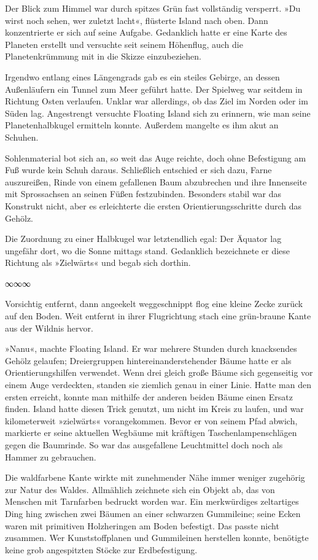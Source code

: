 Der Blick zum Himmel war durch spitzes Grün fast vollständig versperrt. »Du wirst noch sehen, wer zuletzt lacht«, flüsterte Island nach oben. Dann konzentrierte er sich auf seine Aufgabe. Gedanklich hatte er eine Karte des Planeten erstellt und versuchte seit seinem Höhenflug, auch die Planetenkrümmung mit in die Skizze einzubeziehen.

Irgendwo entlang eines Längengrads gab es ein steiles Gebirge, an dessen Außenläufern ein Tunnel zum Meer geführt hatte. Der Spielweg war seitdem in Richtung Osten verlaufen. Unklar war allerdings, ob das Ziel im Norden oder im Süden lag. Angestrengt versuchte Floating Island sich zu erinnern, wie man seine Planetenhalbkugel ermitteln konnte. Außerdem mangelte es ihm akut an Schuhen.

Sohlenmaterial bot sich an, so weit das Auge reichte, doch ohne Befestigung am Fuß wurde kein Schuh daraus. Schließlich entschied er sich dazu, Farne auszureißen, Rinde von einem gefallenen Baum abzubrechen und ihre Innenseite mit Sprossachsen an seinen Füßen festzubinden. Besonders stabil war das Konstrukt nicht, aber es erleichterte die ersten Orientierungsschritte durch das Gehölz.

Die Zuordnung zu einer Halbkugel war letztendlich egal: Der Äquator lag ungefähr dort, wo die Sonne mittags stand. Gedanklich bezeichnete er diese Richtung als »Zielwärts« und begab sich dorthin.

\begin{center}
	∞∞∞
\end{center}

Vorsichtig entfernt, dann angeekelt weggeschnippt flog eine kleine Zecke zurück auf den Boden. Weit entfernt in ihrer Flugrichtung stach eine grün-braune Kante aus der Wildnis hervor.

»Nanu«, machte Floating Island. Er war mehrere Stunden durch knacksendes Gehölz gelaufen; Dreiergruppen hintereinanderstehender Bäume hatte er als Orientierungshilfen verwendet. Wenn drei gleich große Bäume sich gegenseitig vor einem Auge verdeckten, standen sie ziemlich genau in einer Linie. Hatte man den ersten erreicht, konnte man mithilfe der anderen beiden Bäume einen Ersatz finden. Island hatte diesen Trick genutzt, um nicht im Kreis zu laufen, und war kilometerweit »zielwärts« vorangekommen. Bevor er von seinem Pfad abwich, markierte er seine aktuellen Wegbäume mit kräftigen Taschenlampenschlägen gegen die Baumrinde. So war das ausgefallene Leuchtmittel doch noch als Hammer zu gebrauchen.

Die waldfarbene Kante wirkte mit zunehmender Nähe immer weniger zugehörig zur Natur des Waldes. Allmählich zeichnete sich ein Objekt ab, das von Menschen mit Tarnfarben bedruckt worden war. Ein merkwürdiges zeltartiges Ding hing zwischen zwei Bäumen an einer schwarzen Gummileine; seine Ecken waren mit primitiven Holzheringen am Boden befestigt. Das passte nicht zusammen. Wer Kunststoffplanen und Gummileinen herstellen konnte, benötigte keine grob angespitzten Stöcke zur Erdbefestigung.

